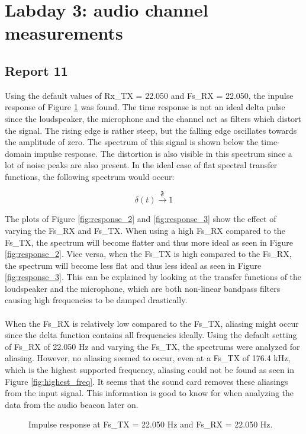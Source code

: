 \documentclass[final]{scrreprt} %
\begin{document}
\section{Labday 3: audio channel measurements}
\subsection{Report 11}
Using the default values of Rx\_TX = 22.050 and Fs\_RX = 22.050, the inpulse response of Figure \ref{fig:response_1} was found.
The time response is not an ideal delta pulse since the loudspeaker, the microphone and the channel act as filters which distort the signal.
The rising edge is rather steep, but the falling edge oscillates towards the amplitude of zero.
The spectrum of this signal is shown below the time-domain impulse response.
The distortion is also visible in this spectrum since a lot of noise peaks are also present.
In the ideal case of flat spectral transfer functions, the following spectrum would occur:

\begin{equation}
	\delta(t) \xrightarrow{\mathfrak{F}} 1
\end{equation}

The plots of Figure \ref{fig:response_2} and \ref{fig:response_3} show the effect of varying the Fs\_RX and Fs\_TX.
When using a high Fs\_RX compared to the Fs\_TX, the spectrum will become flatter and thus more ideal as seen in Figure \ref{fig:response_2}.
Vice versa, when the Fs\_TX is high compared to the Fs\_RX, the spectrum will become less flat and thus less ideal as seen in Figure \ref{fig:response_3}.
This can be explained by looking at the transfer functions of the loudspeaker and the microphone, which are both non-linear bandpass filters causing high frequencies to be damped drastically.
\\ \\
When the Fs\_RX is relatively low compared to the Fs\_TX, aliasing might occur since the delta function contains all frequencies ideally.
Using the default setting of Fs\_RX of 22.050 Hz and varying the Fs\_TX, the spectrums were analyzed for aliasing.
However, no aliasing seemed to occur, even at a Fs\_TX of 176.4 kHz, which is the highest supported frequency, aliasing could not be found as seen in Figure \ref{fig:highest_freq}.
It seems that the sound card removes these aliasings from the input signal.
This information is good to know for when analyzing the data from the audio beacon later on.

\begin{figure}[H]
	\centering
	\setlength\figureheight{4cm}
    	\setlength{}
	
	\caption{Impulse response at Fs\_TX = 22.050 Hz and Fs\_RX = 22.050 Hz.}
	\label{fig:response_1}
\end{figure}
\end{document}
